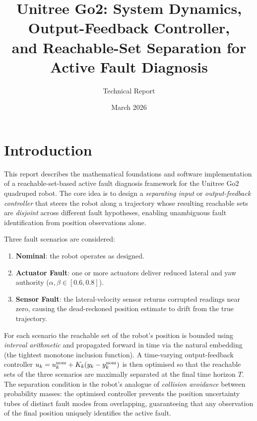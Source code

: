 \documentclass[11pt]{article}
\title{\textbf{Unitree Go2: System Dynamics, Output-Feedback Controller,\\
               and Reachable-Set Separation for Active Fault Diagnosis}}
\author{Technical Report}
\date{March 2026}
\begin{document}
\maketitle
\tableofcontents
\newpage

\section{Introduction}

This report describes the mathematical foundations and software implementation
of a reachable-set-based active fault diagnosis framework for the Unitree Go2
quadruped robot. The core idea is to design a \emph{separating input} or
\emph{output-feedback controller} that steers the robot along a trajectory
whose resulting reachable sets are \emph{disjoint} across different fault
hypotheses, enabling unambiguous fault identification from position
observations alone.

Three fault scenarios are considered:
\begin{enumerate}
  \item \textbf{Nominal}: the robot operates as designed.
  \item \textbf{Actuator Fault}: one or more actuators deliver reduced lateral
        and yaw authority ($\alpha, \beta \in [0.6, 0.8]$).
  \item \textbf{Sensor Fault}: the lateral-velocity sensor returns corrupted
        readings near zero, causing the dead-reckoned position estimate to
        drift from the true trajectory.
\end{enumerate}

For each scenario the reachable set of the robot's position is bounded using
\emph{interval arithmetic} and propagated forward in time via the natural
embedding (the tightest monotone inclusion function). A time-varying
output-feedback controller $u_k = u_k^{\rm nom} + K_k(y_k - y_k^{\rm nom})$
is then optimised so that the reachable sets of the three scenarios are
maximally separated at the final time horizon $T$. The separation condition
is the robot's analogue of \emph{collision avoidance} between probability
masses: the optimised controller prevents the position uncertainty tubes of
distinct fault modes from overlapping, guaranteeing that any observation of
the final position uniquely identifies the active fault.
\end{document}
